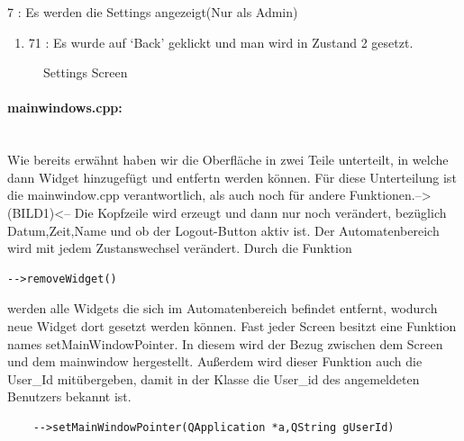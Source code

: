 \documentclass[11pt,a4paper]{article} %
\begin{document}
		7 : Es werden die Settings angezeigt(Nur als Admin)
\begin{enumerate}		
			\item	71 : Es wurde auf `Back' geklickt und man wird in Zustand 2 gesetzt.
\end{enumerate}
\begin{figure}[h]
	\caption{Settings Screen}
	\end{figure}

\paragraph{mainwindows.cpp:} $\;$ \\
	Wie bereits erwähnt haben wir die Oberfläche in zwei Teile unterteilt, in welche dann Widget hinzugefügt und entfertn werden können. 
	Für diese Unterteilung ist die mainwindow.cpp verantwortlich, als auch noch für andere Funktionen.-->(BILD1)<--
	Die Kopfzeile wird erzeugt und dann nur noch verändert, bezüglich Datum,Zeit,Name und ob der Logout-Button aktiv ist.
	Der Automatenbereich wird mit jedem Zustanswechsel verändert.
	Durch die Funktion 
	\begin{frame}

\begin{lstlisting}
-->removeWidget()
\end{lstlisting}
\end{frame}
werden alle Widgets die sich im Automatenbereich befindet entfernt, wodurch neue Widget dort gesetzt werden können.
	Fast jeder Screen besitzt eine Funktion names setMainWindowPointer. In diesem wird der Bezug zwischen dem Screen und dem mainwindow hergestellt.
	Außerdem wird dieser Funktion auch die User\_Id mitübergeben, damit in der Klasse die User\_id des angemeldeten Benutzers bekannt ist.
	\begin{frame}

\begin{lstlisting}
	-->setMainWindowPointer(QApplication *a,QString gUserId)
	\end{lstlisting}
\end{frame}
	
\end{document}
